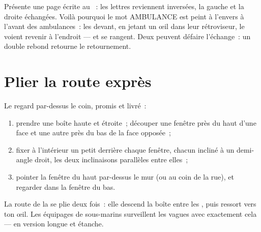 \begin{example}\label{ex:g5:mirrors-reflection:swap}
Présente une page écrite au ~: les lettres reviennent
inversées, la gauche et la droite échangées. Voilà pourquoi le mot
AMBULANCE est peint à l'envers à l'avant des ambulances~: les
 devant, en jetant un œil dans leur rétroviseur, le voient
revenir à l'endroit --- et se rangent. Deux  peuvent défaire
l'échange~: un double rebond retourne le retournement.
\end{example}

\section{Plier la route exprès}

\begin{method}\label{met:g5:mirrors-reflection:periscope}
Le regard par-dessus le coin, promis et livré~:
\begin{enumerate}
  \item prendre une boîte haute et étroite~; découper une fenêtre
        près du haut d'une face et une autre près du bas de la face
        opposée~;
  \item fixer à l'intérieur un petit  derrière chaque fenêtre,
        chacun incliné à un demi-angle droit, les deux inclinaisons
        parallèles entre elles~;
  \item pointer la fenêtre du haut par-dessus le mur (ou au coin de
        la rue), et regarder dans la fenêtre du bas.
\end{enumerate}
La route de la  se plie deux fois~: elle descend la boîte
entre les , puis ressort vers ton œil. Les équipages de
sous-marins surveillent les vagues avec exactement cela --- en
version longue et étanche.
\end{method}

